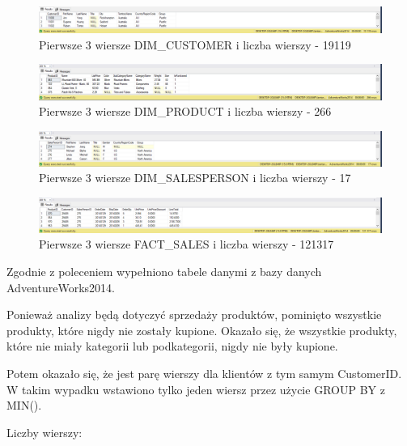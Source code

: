 \documentclass[a4paper,12pt]{article}
\begin{document}
\begin{figure}[H]
    \centering
    \includegraphics[width=1.0\textwidth]{images/3_customers.png}
    \caption{Pierwsze 3 wiersze DIM\_CUSTOMER i liczba wierszy - 19119}
\end{figure}

\begin{figure}[H]
    \centering
    \includegraphics[width=1.0\textwidth]{images/3_products.png}
    \caption{Pierwsze 3 wiersze DIM\_PRODUCT i liczba wierszy - 266}
\end{figure}

\begin{figure}[H]
    \centering
    \includegraphics[width=1.0\textwidth]{images/3_sale_people.png}
    \caption{Pierwsze 3 wiersze DIM\_SALESPERSON i liczba wierszy - 17}
\end{figure}

\begin{figure}[H]
    \centering
    \includegraphics[width=1.0\textwidth]{images/3_sales.png}
    \caption{Pierwsze 3 wiersze FACT\_SALES i liczba wierszy - 121317}
\end{figure}

Zgodnie z poleceniem wypełniono tabele danymi z bazy danych AdventureWorks2014.

Ponieważ analizy będą dotyczyć sprzedaży produktów, pominięto wszystkie produkty, które nigdy nie zostały kupione. Okazało się, że wszystkie produkty, które nie miały kategorii lub podkategorii, nigdy nie były kupione.

Potem okazało się, że jest parę wierszy dla klientów z tym samym CustomerID. W takim wypadku wstawiono tylko jeden wiersz przez użycie GROUP BY z MIN().

Liczby wierszy:
\end{document}
